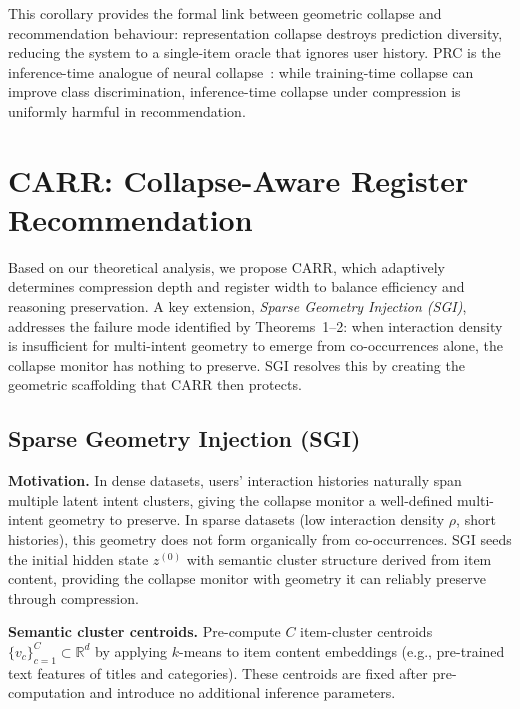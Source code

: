 \documentclass[lettersize,journal]{IEEEtran}
\begin{document}
This corollary provides the formal link between geometric collapse and recommendation behaviour: representation collapse destroys prediction diversity, reducing the system to a single-item oracle that ignores user history. PRC is the inference-time analogue of neural collapse~\cite{papyan2020prevalence,zhu2021geometric}: while training-time collapse can improve class discrimination, inference-time collapse under compression is uniformly harmful in recommendation.

\section{CARR: Collapse-Aware Register Recommendation}

Based on our theoretical analysis, we propose CARR, which adaptively determines compression depth and register width to balance efficiency and reasoning preservation. A key extension, \emph{Sparse Geometry Injection (SGI)}, addresses the failure mode identified by Theorems~1--2: when interaction density is insufficient for multi-intent geometry to emerge from co-occurrences alone, the collapse monitor has nothing to preserve. SGI resolves this by creating the geometric scaffolding that CARR then protects.

\subsection{Sparse Geometry Injection (SGI)}
\label{subsec:sgi}

\textbf{Motivation.} In dense datasets, users' interaction histories naturally span multiple latent intent clusters, giving the collapse monitor a well-defined multi-intent geometry to preserve. In sparse datasets (low interaction density $\rho$, short histories), this geometry does not form organically from co-occurrences. SGI seeds the initial hidden state $z^{(0)}$ with semantic cluster structure derived from item content, providing the collapse monitor with geometry it can reliably preserve through compression.

\textbf{Semantic cluster centroids.} Pre-compute $C$ item-cluster centroids $\{v_c\}_{c=1}^C \subset \mathbb{R}^d$ by applying $k$-means to item content embeddings (e.g., pre-trained text features of titles and categories). These centroids are fixed after pre-computation and introduce no additional inference parameters.
\end{document}
